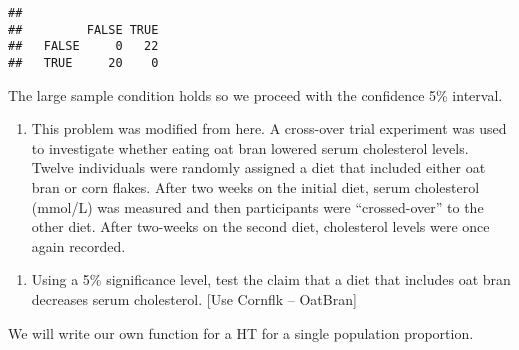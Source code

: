\documentclass[
]{article}
\newenvironment{Shaded}{\begin{snugshade}}{\end{snugshade}}
\newcommand{\KeywordTok}[1]{\textcolor[rgb]{0.13,0.29,0.53}{\textbf{#1}}}
\newcommand{\NormalTok}[1]{#1}
\newcommand{\OperatorTok}[1]{\textcolor[rgb]{0.81,0.36,0.00}{\textbf{#1}}}
\newcommand{\StringTok}[1]{\textcolor[rgb]{0.31,0.60,0.02}{#1}}
\providecommand{\tightlist}{%
  \setlength{\itemsep}{0pt}\setlength{\parskip}{0pt}}
\begin{document}
\begin{Shaded}
\end{Shaded}

\begin{verbatim}
##        
##         FALSE TRUE
##   FALSE     0   22
##   TRUE     20    0
\end{verbatim}

The large sample condition holds so we proceed with the confidence 5\%
interval.

\begin{enumerate}
\def\labelenumi{\arabic{enumi}.}
\setcounter{enumi}{4}
\tightlist
\item
  This problem was modified from here. A cross-over trial experiment was
  used to investigate whether eating oat bran lowered serum cholesterol
  levels. Twelve individuals were randomly assigned a diet that included
  either oat bran or corn flakes. After two weeks on the initial diet,
  serum cholesterol (mmol/L) was measured and then participants were
  ``crossed-over'' to the other diet. After two-weeks on the second
  diet, cholesterol levels were once again recorded.
\end{enumerate}

\begin{enumerate}
\def\labelenumi{\alph{enumi}.}
\tightlist
\item
  Using a 5\% significance level, test the claim that a diet that
  includes oat bran decreases serum cholesterol. {[}Use Cornflk --
  OatBran{]}
\end{enumerate}

We will write our own function for a HT for a single population
proportion.
\end{document}
